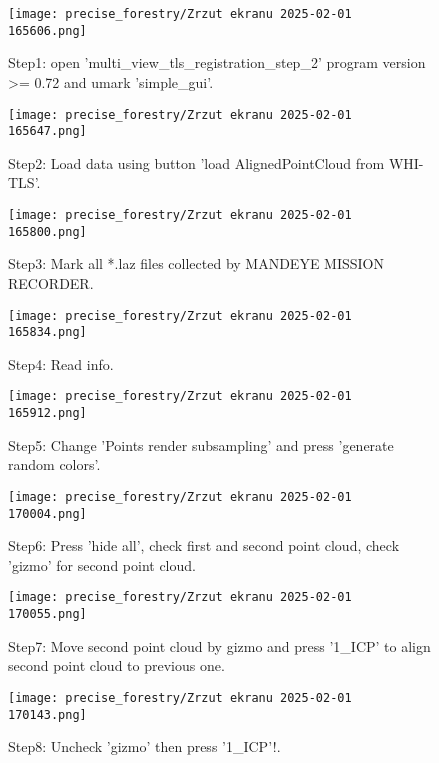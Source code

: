 \begin{figure}[H]
	\centering
	\texttt{[image: precise\_forestry/Zrzut ekranu 2025-02-01 165606.png]}
	\caption{Step1: open 'multi\_view\_tls\_registration\_step\_2' program version >= 0.72 and umark 'simple\_gui'.}
	\label{fig:pf6}
\end{figure}

\begin{figure}[H]
	\centering
	\texttt{[image: precise\_forestry/Zrzut ekranu 2025-02-01 165647.png]}
	\caption{Step2: Load data using button 'load AlignedPointCloud from WHI-TLS'.}
	\label{fig:pf7}
\end{figure}

\begin{figure}[H]
	\centering
	\texttt{[image: precise\_forestry/Zrzut ekranu 2025-02-01 165800.png]}
	\caption{Step3: Mark all *.laz files collected by MANDEYE MISSION RECORDER.}
	\label{fig:pf8}
\end{figure}

\begin{figure}[H]
	\centering
	\texttt{[image: precise\_forestry/Zrzut ekranu 2025-02-01 165834.png]}
	\caption{Step4: Read info.}
	\label{fig:pf9}
\end{figure}

\begin{figure}[H]
	\centering
	\texttt{[image: precise\_forestry/Zrzut ekranu 2025-02-01 165912.png]}
	\caption{Step5: Change 'Points render subsampling' and press 'generate random colors'.}
	\label{fig:pf10}
\end{figure}

\begin{figure}[H]
	\centering
	\texttt{[image: precise\_forestry/Zrzut ekranu 2025-02-01 170004.png]}
	\caption{Step6: Press 'hide all', check first and second point cloud, check 'gizmo' for second point cloud.}
	\label{fig:pf11}
\end{figure}

\begin{figure}[H]
	\centering
	\texttt{[image: precise\_forestry/Zrzut ekranu 2025-02-01 170055.png]}
	\caption{Step7: Move second point cloud by gizmo and press '1_ICP' to align second point cloud to previous one.}
	\label{fig:pf12}
\end{figure}

\begin{figure}[H]
	\centering
	\texttt{[image: precise\_forestry/Zrzut ekranu 2025-02-01 170143.png]}
	\caption{Step8: Uncheck 'gizmo' then press '1_ICP'!.}
	\label{fig:pf13}
\end{figure}

